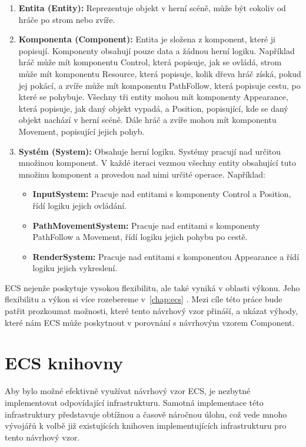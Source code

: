 \begin{enumerate}
    \item \textbf{Entita (Entity):} Reprezentuje objekt v herní scéně, může být cokoliv od hráče po strom nebo zvíře.
    \item \textbf{Komponenta (Component):} Entita je složena z komponent, které ji popisují. Komponenty obsahují pouze data a žádnou herní logiku. Například hráč může mít komponentu Control, která popisuje, jak se ovládá, strom může mít komponentu Resource, která popisuje, kolik dřeva hráč získá, pokud jej pokácí, a zvíře může mít komponentu PathFollow, která popisuje cestu, po které se pohybuje. Všechny tři entity mohou mít komponenty Appearance, která popisuje, jak daný objekt vypadá, a Position, popisující, kde se daný objekt nachází v herní scéně. Dále hráč a zvíře mohou mít komponentu Movement, popisující jejich pohyb.
    \item \textbf{Systém (System):} Obsahuje herní logiku. Systémy pracují nad určitou množinou komponent. V každé iteraci vezmou všechny entity obsahující tuto množinu komponent a provedou nad nimi určité operace. Například:
    \begin{itemize}
        \item \textbf{InputSystem:} Pracuje nad entitami s komponenty Control a Position, řídí logiku jejich ovládání.
        \item \textbf{PathMovementSystem:} Pracuje nad entitami s komponenty PathFollow a Movement, řídí logiku jejich pohybu po cestě.
        \item \textbf{RenderSystem:} Pracuje nad entitami s komponentou Appearance a řídí logiku jejich vykreslení.
    \end{itemize}
\end{enumerate}

ECS nejenže poskytuje vysokou flexibilitu, ale také vyniká v oblasti výkonu. Jeho flexibilitu a výkon si více rozebereme v~\cref{chap:ecs} . Mezi cíle této práce bude patřit prozkoumat možnosti, které tento návrhový vzor přináší, a ukázat výhody, které nám ECS může poskytnout v porovnání s návrhovým vzorem Component.

\section{ECS knihovny}
Aby bylo možné efektivně využívat návrhový vzor ECS, je nezbytné implementovat odpovídající infrastrukturu. Samotná implementace této infrastruktury představuje obtížnou a časově náročnou úlohu, což vede mnoho vývojářů k volbě již existujících knihoven implementujících infrastrukturu pro tento návrhový vzor.

